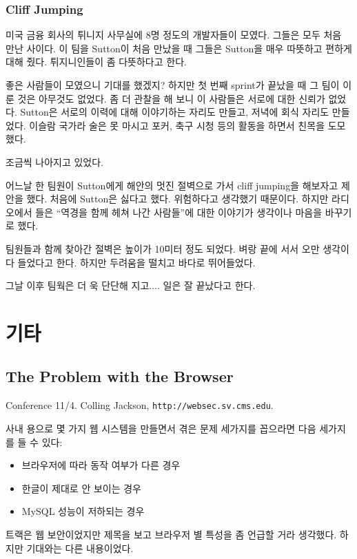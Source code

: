 \documentclass[11pt]{article}
\begin{document}
\subsubsection{Cliff Jumping}
 
미국 금융 회사의 튀니지 사무실에 8명 정도의 개발자들이 모였다. 그들은
모두 처음 만난 사이다.  이 팀을 Sutton이 처음 만났을 때 그들은 Sutton을
매우 따뜻하고 편하게 대해 줬다. 튀지니인들이 좀 다뜻하다고 한다.
 
좋은 사람들이 모였으니 기대를 했겠지? 하지만 첫 번째 sprint가 끝났을 때
그 팀이 이룬 것은 아무것도 없었다. 좀 더 관찰을 해 보니 이 사람들은
서로에 대한 신뢰가 없었다. Sutton은 서로의 이력에 대해 이야기하는
자리도 만들고, 저녁에 회식 자리도 만들었다. 이슬람 국가라 술은 못
마시고 포커, 축구 시청 등의 활동을 하면서 친목을 도모했다.
 
조금씩 나아지고 있었다.
 
어느날 한 팀원이 Sutton에게 해안의 멋진 절벽으로 가서 cliff jumping을
해보자고 제안을 했다. 처음에 Sutton은 싫다고 했다. 위험하다고 생각했기
때문이다.  하지만 라디오에서 들은 ``역경을 함께 헤쳐 나간 사람들''에 대한
이야기가 생각이나 마음을 바꾸기로 했다.
 
팀원들과 함께 찾아간 절벽은 높이가 10미터 정도 되었다. 벼랑 끝에 서서
오만 생각이 다 들었다고 한다. 하지만 두려움을 떨치고 바다로
뛰어들었다.
 
그날 이후 팀웍은 더 욱 단단해 지고.... 일은 잘 끝났다고 한다.
 
\section{기타}

\subsection{The Problem with the Browser}

Conference 11/4. Colling Jackson, \texttt{http://websec.sv.cms.edu}.
 
사내 용으로 몇 가지 웹 시스템을 만들면서 겪은 문제 세가지를 꼽으라면 다음 
세가지를 들 수 있다:
\begin{itemize}
\item 브라우저에 따라 동작 여부가 다른 경우
\item 한글이 제대로 안 보이는 경우
\item MySQL 성능이 저하되는 경우
\end{itemize}
 
트랙은 웹 보안이었지만 제목을 보고 브라우저 별 특성을 좀 언급할 거라 생각했다.
하지만 기대와는 다른 내용이었다.
 
\end{document}

